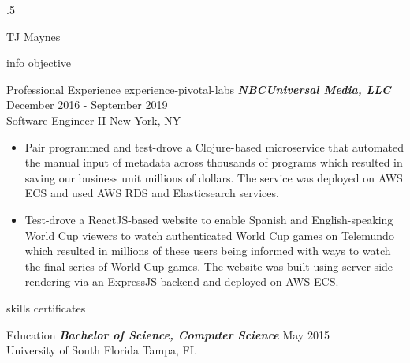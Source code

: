 \documentclass[10pt]{article}
\begin{document}
\moveleft.5\hoffset\centerline{\huge TJ Maynes}
{info}
{objective}
\begin{section}{Professional Experience}
  {experience-pivotal-labs}
  {\sl \textbf{NBCUniversal Media, LLC}} \hfill December 2016 - September 2019 \\ Software Engineer II \hfill New York, NY
  \begin{itemize}
  \item Pair programmed and test-drove a Clojure-based microservice that automated the manual input of metadata across thousands of programs which resulted in saving our business unit millions of dollars. The service was deployed on AWS ECS and used AWS RDS and Elasticsearch services.
  \item Test-drove a ReactJS-based website to enable Spanish and English-speaking World Cup viewers to watch authenticated World Cup games on Telemundo which resulted in millions of these users being informed with ways to watch the final series of World Cup games. The website was built using server-side rendering via an ExpressJS backend and deployed on AWS ECS.
  \end{itemize}
\end{section}
{skills}
{certificates}
\begin{section}{Education}
  {\sl \textbf{Bachelor of Science, Computer Science}} \hfill May 2015  \\
  University of South Florida \hfill Tampa, FL
\end{section}
\end{document}
